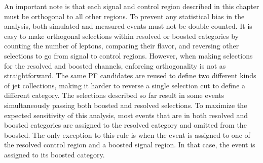 An important note is that each signal and control region described in this chapter
must be orthogonal to all other regions.
To prevent any statistical bias in the analysis,
both simulated and measured events must not be double counted.
It is easy to make orthogonal selections within resolved or boosted categories
by counting the number of leptons, comparing their flavor, and reversing other selections
to go from signal to control regions.
However, when making selections for the resolved and boosted channels,
enforcing orthogonality is not as straightforward.
The same PF candidates are reused to define two different kinds of jet collections,
making it harder to reverse a single selection cut to define a different category.
The selections described so far result in some events simultaneously passing
both boosted and resolved selections.
To maximize the expected sensitivity of this analysis,
most events that are in both resolved and boosted categories are assigned to the
resolved category and omitted from the boosted.
The only exception to this rule is when the event is assigned to
one of the resolved control region and a boosted signal region.
In that case, the event is assigned to its boosted category.
